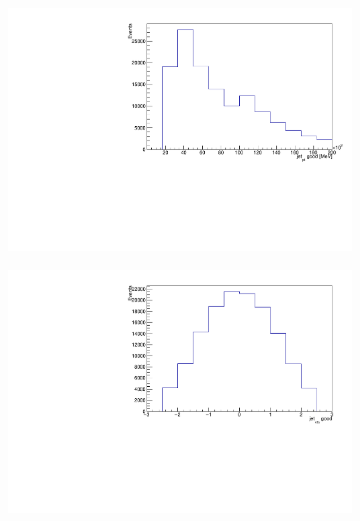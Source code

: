 \begin{figure}[H]
  \begin{subfigure}{0.5\textwidth}
    \centering
    \includegraphics[width=\linewidth]{plots_and_txt/ttbar.mu_selected_/ttbar.mu_selected_jet_pt_good.pdf}
    \caption{}
    \label{fig:lep_pt3}
  \end{subfigure}%
  \begin{subfigure}{0.5\textwidth}
    \centering
    \includegraphics[width=\linewidth]{plots_and_txt/ttbar.mu_selected_/ttbar.mu_selected_jet_eta_good.pdf}
    \caption{}
    \label{fig:btagged3}
  \end{subfigure}%
  \newline
  \begin{subfigure}{0.5\textwidth}
    \centering

\end{subfigure}
\end{figure}
